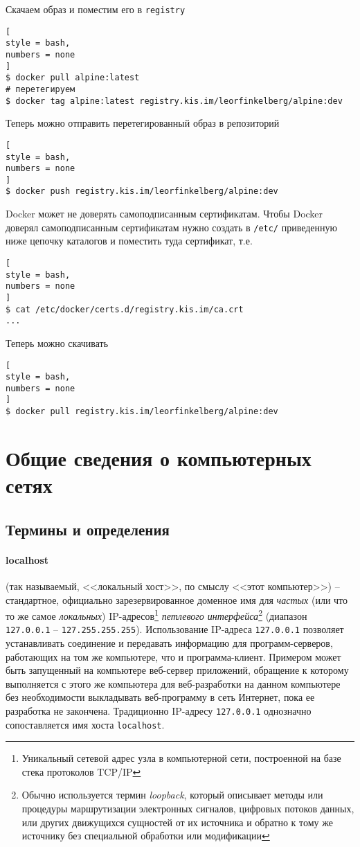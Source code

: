 \documentclass[%
	11pt,
	a4paper,
	utf8,
		]{article}
\begin{document}
Скачаем образ и поместим его в \texttt{registry}
\begin{lstlisting}[
style = bash,
numbers = none
]
$ docker pull alpine:latest
# перетегируем
$ docker tag alpine:latest registry.kis.im/leorfinkelberg/alpine:dev
\end{lstlisting}

Теперь можно отправить перетегированный образ в репозиторий
\begin{lstlisting}[
style = bash,
numbers = none
]
$ docker push registry.kis.im/leorfinkelberg/alpine:dev
\end{lstlisting}

Docker может не доверять самоподписанным сертификатам. Чтобы Docker доверял самоподписанным сертификатам нужно создать в \verb|/etc/| приведенную ниже цепочку каталогов и поместить туда сертификат, т.е.
\begin{lstlisting}[
style = bash,
numbers = none
]
$ cat /etc/docker/certs.d/registry.kis.im/ca.crt
...
\end{lstlisting}

Теперь можно скачивать
\begin{lstlisting}[
style = bash,
numbers = none
]
$ docker pull registry.kis.im/leorfinkelberg/alpine:dev
\end{lstlisting}



\section{Общие сведения о компьютерных сетях}

\subsection{Термины и определения}

\paragraph{{localhost}} (так называемый, <<локальный хост>>, по смыслу <<этот компьютер>>) -- стандартное, официально зарезервированное доменное имя для \emph{частых} (или что то же самое \emph{локальных}) IP-адресов\footnote{Уникальный сетевой адрес узла в компьютерной сети, построенной на базе стека протоколов TCP/IP} \emph{петлевого интерфейса}\footnote{Обычно используется термин \emph{loopback}, который описывает методы или процедуры маршрутизации электронных сигналов, цифровых потоков данных, или других движущихся сущностей от их источника и обратно к тому же источнику без специальной обработки или модификации} (диапазон \texttt{127.0.0.1} -- \texttt{127.255.255.255}). Использование IP-адреса \texttt{127.0.0.1} позволяет устанавливать соединение и передавать информацию для программ-серверов, работающих на том же компьютере, что и программа-клиент. Примером может быть запущенный на компьютере веб-сервер приложений, обращение к которому выполняется с этого же компьютера для веб-разработки на данном компьютере без необходимости выкладывать веб-программу в сеть Интернет, пока ее разработка не закончена. Традиционно IP-адресу \texttt{127.0.0.1} однозначно сопоставляется имя хоста \texttt{localhost}.
\end{document}
